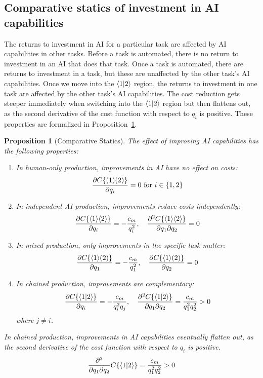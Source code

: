\documentclass{article}
\theoremstyle{plain}
\theoremstyle{plain}
\newtheorem{proposition}[theorem]{Proposition}
\begin{document}
\subsection{Comparative statics of investment in AI capabilities}
The returns to investment in AI for a particular task are affected by AI capabilities in other tasks.
Before a task is automated, there is no return to investment in an AI that does that task.
Once a task is automated, there are returns to investment in a task, but these are unaffected by the other task's AI capabilities.
Once we move into the $\langle 1|2 \rangle$ region, the returns to investment in one task are affected by the other task's AI capabilities.
The cost reduction gets steeper immediately when switching into the $\langle 1|2 \rangle$ region but then flattens out, as the second derivative of the cost function with respect to $q_i$ is positive.
These properties are formalized in Proposition~\ref{prop:comparative_statics}.

\begin{proposition}[Comparative Statics] \label{prop:comparative_statics}
  The effect of improving AI capabilities has the following properties:
  \begin{enumerate}
  \item In human-only production, improvements in AI have no effect on costs:
  \[\frac{\partial C\{ ( 1 )( 2 ) \}}{\partial q_i} = 0 \text{ for } i \in \{1,2\}\]
  \item In independent AI production, improvements reduce costs independently:
  \[\frac{\partial C\{ \langle 1 \rangle\langle 2 \rangle \}}{\partial q_i} = -\frac{c_m}{q_i^2}, \quad \frac{\partial^2 C\{ \langle 1 \rangle\langle 2 \rangle \}}{\partial q_1 \partial q_2} = 0\]
  \item In mixed production, only improvements in the specific task matter:
  \[\frac{\partial C\{ \langle 1 \rangle( 2 ) \}}{\partial q_1} = -\frac{c_m}{q_1^2}, \quad \frac{\partial C\{ \langle 1 \rangle( 2 ) \}}{\partial q_2} = 0\]
  \item In chained production, improvements are complementary:
  \[\frac{\partial C\{ \langle 1|2 \rangle \}}{\partial q_i} = -\frac{c_m}{q_i^2q_j}, \quad \frac{\partial^2 C\{ \langle 1|2 \rangle \}}{\partial q_1 \partial q_2} = \frac{c_m}{q_1^2q_2^2} > 0\]
  where $j \neq i$.
  \end{enumerate}

  In chained production, improvements in AI capabilities eventually flatten out, as the second derivative of the cost function with respect to $q_i$ is positive.
  \begin{equation}
      \frac{\partial^2}{\partial q_1 \partial q_2} C\{ \langle 1|2 \rangle \} = \frac{c_m}{q_1^2q_2^2} > 0
  \end{equation}

\end{proposition}
 
\end{document}

